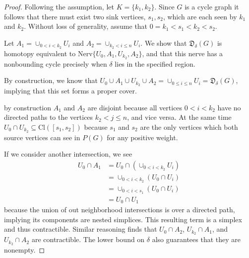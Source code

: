 \documentclass[pdflatex,bst/sn-mathphys-num]{sn-jnl}%
\theoremstyle{thmstyleone}%
\theoremstyle{definition}
\theoremstyle{thmstyletwo}%
\newcommand{\FD}{\mathfrak{D}}
\theoremstyle{thmstylethree}%
\begin{document}
\begin{proof}
    Following the assumption, let $K=\{k_1,k_2\}$. Since $G$ is a cycle graph it follows that there must exist two sink vertices, $s_1,s_2$, which are each seen by $k_1$ and $k_2$. Without loss of generality, assume that $0=k_1<s_1<k_2<s_2$.

    Let $A_1=\cup_{0<i<k_2}U_i$ and $A_2=\cup_{k_2<i\leq n}U_i$. We show that $\FD_\delta(G)$ is homotopy equivalent to Nerv$\{U_0,A_1,U_{k_2},A_2\}$, and that this nerve has a nonbounding cycle precisely when $\delta$ lies in the specified region.

    By construction, we know that $U_0\cup A_1\cup U_{k_2}\cup A_2=\cup_{0\leq i\leq n}U_i=\FD_\delta(G)$, implying that this set forms a proper cover.

    by construction $A_1$ and $A_2$ are disjoint because all vertices $0<i<k_2$ have no directed paths to the vertices $k_2<j\leq n$, and vice versa. At the same time $U_0\cap U_{k_2}\subseteq\text{Cl}([s_1,s_2])$ because $s_1$ and $s_2$ are the only vertices which both source vertices can see in $P(G)$ for any positive weight.

    If we consider another intersection, we see
    \begin{align*}
        U_0\cap A_1 
        &=
        U_0\cap \left(\cup_{0<i<k_2}U_i\right)
        \\
        &=
        \cup_{0<i<k_2} 
        \left(
        U_0\cap U_i
        \right)
        \\
        &=
        \cup_{0<i<s_1} 
        \left(
        U_0\cap U_i
        \right)\\
        &=U_0\cap U_1
    \end{align*}
    because the union of out neighborhood 
    intersections is over a directed path, implying its components are nested simplices. This resulting term is a simplex and thus contractible. Similar reasoning finds that $U_0\cap A_2$, $U_{k_2}\cap A_1$, and $U_{k_2}\cap A_2$ are contractible. The lower bound on $\delta$ also guarantees that they are nonempty.
    

\end{proof}
\end{document}
